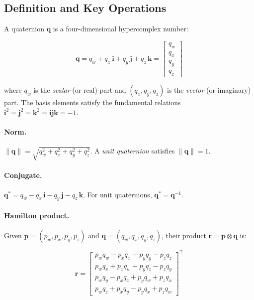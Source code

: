 \subsection{Definition and Key Operations}
\label{sec:quat:def}

A quaternion $\mathbf{q}$ is a four-dimensional hypercomplex number:

\begin{equation}
  \mathbf{q} = q_w + q_x\,\mathbf{i} + q_y\,\mathbf{j} + q_z\,\mathbf{k}
             = \begin{bmatrix} q_w \\ q_x \\ q_y \\ q_z \end{bmatrix}
  \label{eq:quat_def}
\end{equation}

\noindent where $q_w$ is the \emph{scalar} (or real) part and
$(q_x, q_y, q_z)$ is the \emph{vector} (or imaginary) part. The basis
elements satisfy the fundamental relations $\mathbf{i}^2 = \mathbf{j}^2 =
\mathbf{k}^2 = \mathbf{i}\mathbf{j}\mathbf{k} = -1$.

\paragraph{Norm.}
$\|\mathbf{q}\| = \sqrt{q_w^2 + q_x^2 + q_y^2 + q_z^2}$.
A \emph{unit quaternion} satisfies $\|\mathbf{q}\| = 1$.

\paragraph{Conjugate.}
$\mathbf{q}^* = q_w - q_x\,\mathbf{i} - q_y\,\mathbf{j} - q_z\,\mathbf{k}$.
For unit quaternions, $\mathbf{q}^* = \mathbf{q}^{-1}$.

\paragraph{Hamilton product.}
Given $\mathbf{p} = (p_w, p_x, p_y, p_z)$ and
$\mathbf{q} = (q_w, q_x, q_y, q_z)$, their product $\mathbf{r} =
\mathbf{p} \otimes \mathbf{q}$ is:

\begin{equation}
  \mathbf{r} = \begin{bmatrix}
    p_w q_w - p_x q_x - p_y q_y - p_z q_z \\
    p_w q_x + p_x q_w + p_y q_z - p_z q_y \\
    p_w q_y - p_x q_z + p_y q_w + p_z q_x \\
    p_w q_z + p_x q_y - p_y q_x + p_z q_w
  \end{bmatrix}^\top
  \label{eq:hamilton}
\end{equation}

